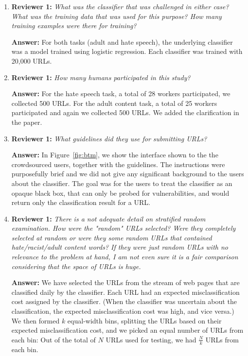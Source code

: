 \documentclass[letterpaper]{article}
\begin{document}
\begin{enumerate}
\item \textbf{Reviewer 1:} \emph{What was the classifier that was challenged in either case? What was the training data that was used for this purpose? How many training examples were there for training?}

\textbf{Answer:} For both tasks (adult and hate speech), the underlying classifier was a model trained using logistic regression. Each classifier was trained with 20,000 URLs.

\item \textbf{Reviewer 1:} \emph{How many humans participated in this study?}

\textbf{Answer:} For the hate speech task, a total of 28 workers participated, we collected 500 URLs. For the adult content task, a total of 25 workers participated and again we collected 500 URLs. We added the clarification in the paper.

\item \textbf{Reviewer 1:} \emph{What guidelines did they use for submitting URLs?}

\textbf{Answer:} In Figure~\ref{fig:btm}, we show the interface shown to the the crowdsourced users, together with the guidelines. The instructions were purposefully brief and we did not give any significant background to the users about the classifier. The goal was for the users to treat the classifier as an opaque black box, that can only be probed for vulnerabilities, and would return only the classification result for a URL.

\item \textbf{Reviewer 1:} \emph{ There is a not adequate detail on stratified random examination. How were the "random" URLs selected?  Were they completely selected at random or were they some random URLs that contained hate/racist/adult content words? If they were just random URLs with no relevance to the problem at hand, I am not even sure it is a fair comparison considering that the space of URLs is huge.}

\textbf{Answer:} We have selected the URLs from the stream of web pages that are classified daily by the classifier. Each URL had an expected misclassification cost assigned by the classifier. (When the classifier was uncertain about the classification, the expected misclassification cost was high, and vice versa.) We then formed $k$ equal-width bins, splitting the URLs based on their expected misclassification cost, and we picked an equal number of URLs from each bin: Out of the total of $N$ URLs used for testing, we had  $\frac{N}{k}$ URLs from each bin.



\end{enumerate}
\end{document}
